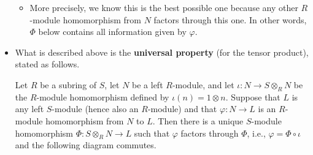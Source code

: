 \documentclass[../notes.tex]{subfiles}
\begin{document}
\begin{itemize}
\begin{itemize}
        \item More precisely, we know this is the best possible one because any other $R$-module homomorphism from $N$ factors through this one. In other words, $\Phi$ below contains all information given by $\varphi$.
    \end{itemize}
    \item What is described above is the \textbf{universal property} (for the tensor product), stated as follows.
    \begin{theorem}\label{trm:10.8}
        Let $R$ be a subring of $S$, let $N$ be a left $R$-module, and let $\iota:N\to S\otimes_RN$ be the $R$-module homomorphism defined by $\iota(n)=1\otimes n$. Suppose that $L$ is any left $S$-module (hence also an $R$-module) and that $\varphi:N\to L$ is an $R$-module homomorphism from $N$ to $L$. Then there is a unique $S$-module homomorphism $\Phi:S\otimes_RN\to L$ such that $\varphi$ factors through $\Phi$, i.e., $\varphi=\Phi\circ\iota$ and the following diagram commutes.
        \begin{figure}[h!]
            \centering
\end{figure}
\end{theorem}
\end{itemize}
\end{document}
